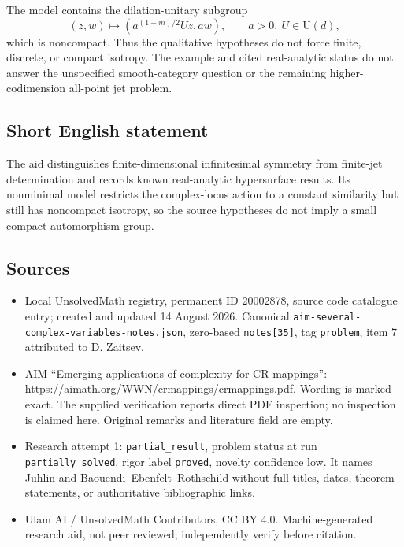 \documentclass[11pt]{article}
\begin{document}
The model contains the dilation-unitary subgroup
\[
 (z,w)\longmapsto(a^{(1-m)/2}Uz,aw),\qquad a>0,\ U\in\mathrm U(d),
\]
which is noncompact. Thus the qualitative hypotheses do not force finite, discrete, or compact isotropy. The example and cited real-analytic status do not answer the unspecified smooth-category question or the remaining higher-codimension all-point jet problem.
\subsection{Short English statement}
The aid distinguishes finite-dimensional infinitesimal symmetry from finite-jet determination and records known real-analytic hypersurface results. Its nonminimal model restricts the complex-locus action to a constant similarity but still has noncompact isotropy, so the source hypotheses do not imply a small compact automorphism group.
\subsection{Sources}
\begin{itemize}
\item Local UnsolvedMath registry, permanent ID 20002878, source code catalogue entry; created and updated 14 August 2026. Canonical \texttt{aim-several-complex-variables-notes.json}, zero-based \texttt{notes[35]}, tag \texttt{problem}, item 7 attributed to D. Zaitsev.
\item AIM ``Emerging applications of complexity for CR mappings'': \url{https://aimath.org/WWN/crmappings/crmappings.pdf}. Wording is marked exact. The supplied verification reports direct PDF inspection; no inspection is claimed here. Original remarks and literature field are empty.
\item Research attempt 1: \texttt{partial\_result}, problem status at run \texttt{partially\_solved}, rigor label \texttt{proved}, novelty confidence low. It names Juhlin and Baouendi--Ebenfelt--Rothschild without full titles, dates, theorem statements, or authoritative bibliographic links.
\item Ulam AI / UnsolvedMath Contributors, CC BY 4.0. Machine-generated research aid, not peer reviewed; independently verify before citation.
\end{itemize}
\end{document}
